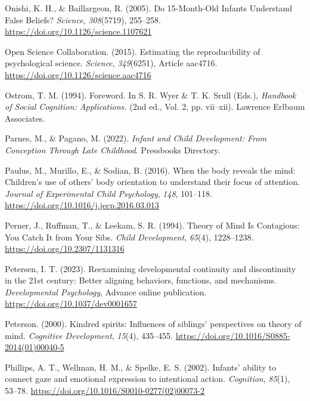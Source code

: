 \documentclass[
]{scrbook}
\newlength{\cslhangindent}
\newenvironment{CSLReferences}[2] %
 {\begin{list}{}{%
  \setlength{\itemindent}{0pt}
  \setlength{\leftmargin}{0pt}
  \setlength{\parsep}{0pt}
  \ifodd #1
   \setlength{\leftmargin}{\cslhangindent}
   \setlength{\itemindent}{-1\cslhangindent}
  \fi
  \setlength{\itemsep}{#2\baselineskip}}}
 {\end{list}}
\begin{document}
\begin{CSLReferences}{1}{0}
Onishi, K. H., \& Baillargeon, R. (2005). Do 15-{Month-Old Infants Understand False Beliefs}? \emph{Science}, \emph{308}(5719), 255--258. \url{https://doi.org/10.1126/science.1107621}

Open Science Collaboration. (2015). Estimating the reproducibility of psychological science. \emph{Science}, \emph{349}(6251), Article aac4716. \url{https://doi.org/10.1126/science.aac4716}

Ostrom, T. M. (1994). Foreword. In S. R. Wyer \& T. K. Srull (Eds.), \emph{Handbook of {Social Cognition}: {Applications}.} (2nd ed., Vol. 2, pp. vii--xii). Lawrence Erlbaum Associates.

Parnes, M., \& Pagano, M. (2022). \emph{Infant and {Child Development}: {From Conception Through Late Childhood}}. Pressbooks Directory.

Paulus, M., Murillo, E., \& Sodian, B. (2016). When the body reveals the mind: {Children}'s use of others' body orientation to understand their focus of attention. \emph{Journal of Experimental Child Psychology}, \emph{148}, 101--118. \url{https://doi.org/10.1016/j.jecp.2016.03.013}

Perner, J., Ruffman, T., \& Leekam, S. R. (1994). Theory of {Mind Is Contagious}: {You Catch It} from {Your Sibs}. \emph{Child Development}, \emph{65}(4), 1228--1238. \url{https://doi.org/10.2307/1131316}

Petersen, I. T. (2023). Reexamining developmental continuity and discontinuity in the 21st century: {Better} aligning behaviors, functions, and mechanisms. \emph{Developmental Psychology}, Advance online publication. \url{https://doi.org/10.1037/dev0001657}

Peterson. (2000). Kindred spirits: {Influences} of siblings' perspectives on theory of mind. \emph{Cognitive Development}, \emph{15}(4), 435--455. \url{https://doi.org/10.1016/S0885-2014(01)00040-5}

Phillips, A. T., Wellman, H. M., \& Spelke, E. S. (2002). Infants' ability to connect gaze and emotional expression to intentional action. \emph{Cognition}, \emph{85}(1), 53--78. \url{https://doi.org/10.1016/S0010-0277(02)00073-2}


\end{CSLReferences}
\end{document}
